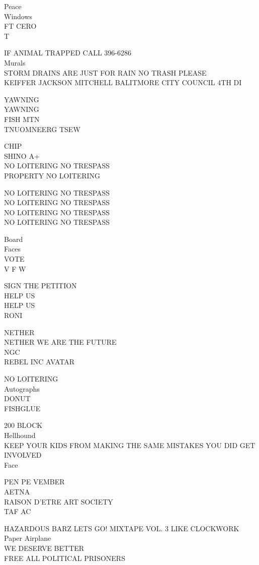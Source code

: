 \documentclass[10pt,letterpaper]{article}
\begin{document}
Peace\\
Windows\\
FT CERO\\
T

IF ANIMAL TRAPPED CALL 396{-}6286\\
Murals\\
STORM DRAINS ARE JUST FOR RAIN NO TRASH PLEASE\\
KEIFFER JACKSON MITCHELL BALITMORE CITY COUNCIL 4TH DI

YAWNING\\
YAWNING\\
FISH MTN\\
TNUOMNEERG TSEW

CHIP\\
SHINO A+\\
NO LOITERING NO TRESPASS\\
PROPERTY NO LOITERING

NO LOITERING NO TRESPASS\\
NO LOITERING NO TRESPASS\\
NO LOITERING NO TRESPASS\\
NO LOITERING NO TRESPASS

Board\\
Faces\\
VOTE\\
V F W

SIGN THE PETITION\\
HELP US\\
HELP US\\
RONI

NETHER\\
NETHER WE ARE THE FUTURE\\
NGC\\
REBEL INC AVATAR

NO LOITERING\\
Autographs\\
DONUT\\
FISHGLUE

200 BLOCK\\
Hellhound\\
KEEP YOUR KIDS FROM MAKING THE SAME MISTAKES YOU DID GET INVOLVED\\
Face

PEN PE VEMBER\\
AETNA\\
RAISON D'ETRE ART SOCIETY\\
TAF AC

HAZARDOUS BARZ LETS GO! MIXTAPE VOL. 3 LIKE CLOCKWORK\\
Paper Airplane\\
WE DESERVE BETTER\\
FREE ALL POLITICAL PRISONERS
\end{document}
